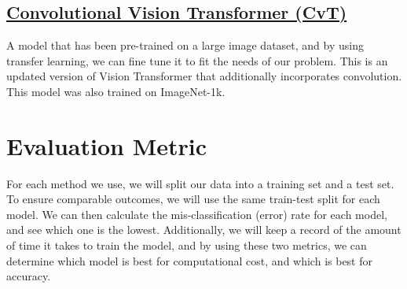 \documentclass{article}
\begin{document}
\subsection*{\href{https://huggingface.co/microsoft/cvt-13}{Convolutional Vision Transformer (CvT)}}
A model that has been pre-trained on a large image dataset, and by using transfer learning, we can fine tune it to fit the needs of our problem. This is an updated version of Vision Transformer that additionally incorporates convolution. This model was also trained on ImageNet-1k.



\section*{Evaluation Metric}

For each method we use, we will split our data into a training set and a test set. To ensure comparable outcomes, we will use the same train-test split for each model. We can then calculate the mis-classification (error) rate for each model, and see which one is the lowest. Additionally, we will keep a record of the amount of time it takes to train the model, and by using these two metrics, we can determine which model is best for computational cost, and which is best for accuracy.


\printbibliography
\end{document}
